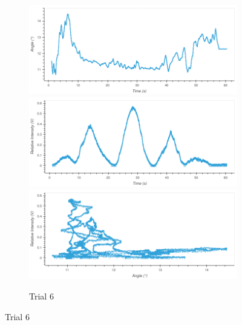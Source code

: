\begin{figure}
\begin{subfigure}{1.0\textwidth}
\caption*{Trial 6}
\includegraphics[width=\plotwidth]{plots/t7-time-angle.png}
\includegraphics[width=\plotwidth]{plots/t7-time-intensity.png}
\includegraphics[width=\plotwidth]{plots/t7-angle-intensity.png}
\end{subfigure}




\end{figure}
